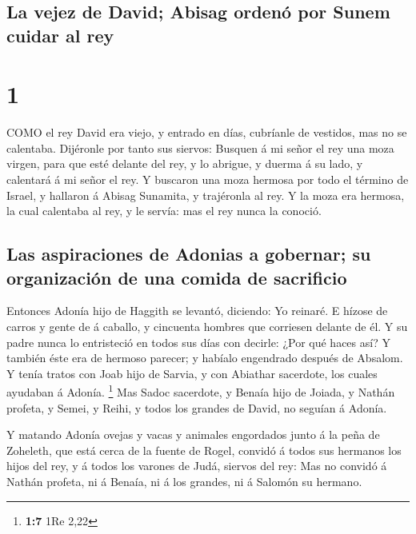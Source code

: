 \hypertarget{la-vejez-de-david-abisag-ordenuxf3-por-sunem-cuidar-al-rey}{%
\subsection{La vejez de David; Abisag ordenó por Sunem cuidar al
rey}\label{la-vejez-de-david-abisag-ordenuxf3-por-sunem-cuidar-al-rey}}

\hypertarget{section}{%
\section{1}\label{section}}

 COMO el rey David era viejo, y entrado en días, cubríanle
de vestidos, mas no se calentaba.  Dijéronle por tanto sus
siervos: Busquen á mi señor el rey una moza virgen, para que esté
delante del rey, y lo abrigue, y duerma á su lado, y calentará á mi
señor el rey.  Y buscaron una moza hermosa por todo el
término de Israel, y hallaron á Abisag Sunamita, y trajéronla al rey.
 Y la moza era hermosa, la cual calentaba al rey, y le
servía: mas el rey nunca la conoció.

\hypertarget{las-aspiraciones-de-adonias-a-gobernar-su-organizaciuxf3n-de-una-comida-de-sacrificio}{%
\subsection{Las aspiraciones de Adonias a gobernar; su organización de
una comida de
sacrificio}\label{las-aspiraciones-de-adonias-a-gobernar-su-organizaciuxf3n-de-una-comida-de-sacrificio}}

 Entonces Adonía hijo de Haggith se levantó, diciendo: Yo
reinaré. E hízose de carros y gente de á caballo, y cincuenta hombres
que corriesen delante de él.  Y su padre nunca lo
entristeció en todos sus días con decirle: ¿Por qué haces así? Y también
éste era de hermoso parecer; y habíalo engendrado después de Absalom.
 Y tenía tratos con Joab hijo de Sarvia, y con Abiathar
sacerdote, los cuales ayudaban á Adonía. \footnote{\textbf{1:7} 1Re 2,22}
 Mas Sadoc sacerdote, y Benaía hijo de Joiada, y Nathán
profeta, y Semei, y Reihi, y todos los grandes de David, no seguían á
Adonía.

 Y matando Adonía ovejas y vacas y animales engordados junto
á la peña de Zoheleth, que está cerca de la fuente de Rogel, convidó á
todos sus hermanos los hijos del rey, y á todos los varones de Judá,
siervos del rey:  Mas no convidó á Nathán profeta, ni á
Benaía, ni á los grandes, ni á Salomón su hermano.

